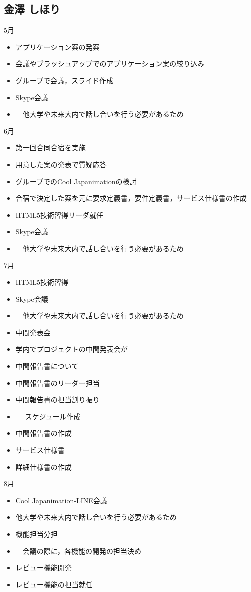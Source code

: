 \subsection{金澤 しほり}
5月
\begin{itemize}
\item アプリケーション案の発案
\item 会議やブラッシュアップでのアプリケーション案の絞り込み
\item グループで会議，スライド作成
\item Skype会議
\item 　他大学や未来大内で話し合いを行う必要があるため
\end{itemize}
6月
\begin{itemize}
\item 第一回合同合宿を実施
\item 用意した案の発表で質疑応答
\item グループでのCool Japanimationの検討
\item 合宿で決定した案を元に要求定義書，要件定義書，サービス仕様書の作成
\item HTML5技術習得リーダ就任
\item Skype会議
\item 　他大学や未来大内で話し合いを行う必要があるため
\end{itemize}
7月
\begin{itemize}
\item HTML5技術習得
\item Skype会議
\item 　他大学や未来大内で話し合いを行う必要があるため
\item 中間発表会
\item 学内でプロジェクトの中間発表会が
\item 中間報告書について
\item   中間報告書のリーダー担当
\item   中間報告書の担当割り振り
\item　 スケジュール作成
\item   中間報告書の作成
\item サービス仕様書
\item 詳細仕様書の作成
\end{itemize}
8月
\begin{itemize}
\item Cool Japanimation-LINE会議
\item   他大学や未来大内で話し合いを行う必要があるため
\item 機能担当分担
\item 　会議の際に，各機能の開発の担当決め
\item レビュー機能開発
\item   レビュー機能の担当就任
\end{itemize}
